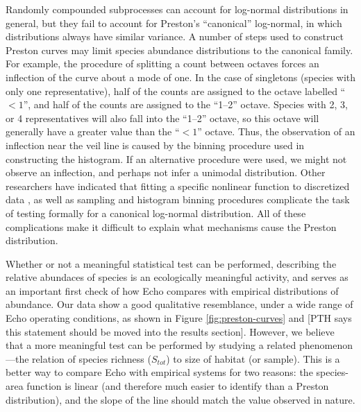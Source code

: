 Randomly compounded subprocesses can account for log-normal
distributions in general, but they fail to account for Preston's
``canonical'' log-normal, in which distributions always have similar
variance.  A number of steps used to construct Preston curves may
limit species abundance distributions to the canonical family.  For
example, the procedure of splitting a count between octaves forces an
inflection of the curve about a mode of one.  In the case of
singletons (species with only one representative), half of the counts
are assigned to the octave labelled ``$<1$'', and half of the counts
are assigned to the ``1--2'' octave.  Species with 2, 3, or 4
representatives will also fall into the ``1--2'' octave, so this
octave will generally have a greater value than the ``$<1$'' octave.
Thus, the observation of an inflection near the veil line is caused by
the binning procedure used in constructing the histogram.  If an
alternative procedure were used, we might not observe an inflection,
and perhaps not infer a unimodal distribution.  Other researchers have
indicated that fitting a specific nonlinear function to discretized
data \cite{Pielou77}, as well as sampling and histogram binning procedures
\cite{May75,May86} complicate the task of testing formally for a
canonical log-normal distribution.  All of these complications make it
difficult to explain what mechanisms cause the Preston distribution.


Whether or not a meaningful statistical test can be performed,
describing the relative abundaces of species is an ecologically
meaningful activity, and serves as an important first check of how
Echo compares with empirical distributions of abundance.  Our data
show a good qualitative resemblance, under a wide range of Echo
operating conditions, as shown in Figure \ref{fig:preston-curves} and
\cite{ForrestAndJones94}  [PTH says this statement should be moved into the
results section].  However, we believe that a more meaningful
test can be performed by studying a related phenomenon---the relation of
species richness ($S_{tot}$) to size of habitat (or sample).  This
is a better way to compare Echo with empirical systems for two
reasons: the species-area function is linear (and therefore much
easier to identify than a Preston distribution), and the slope of the 
line should match the value observed in nature.

